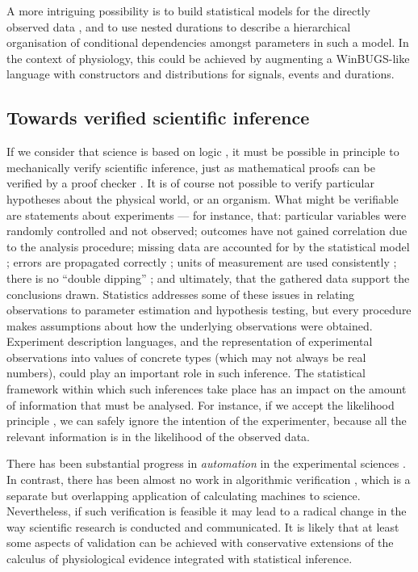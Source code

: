 A more intriguing possibility is to build statistical models for the
directly observed data \citep{Daniell1991}, and to use nested
durations to describe a hierarchical organisation \citep{Rouder2003}
of conditional dependencies amongst parameters in such a model. In the
context of physiology, this could be achieved by augmenting a
WinBUGS-like \citep{Gilks1994} language with constructors and
distributions for signals, events and durations.


\subsection*{Towards verified scientific inference}

If we consider that science is based on logic \citep{Jaynes2003}, it
must be possible in principle to mechanically verify scientific
inference, just as mathematical proofs can be verified by a proof
checker \citep{Harrison2009}. It is of course not possible to verify
particular hypotheses about the physical world, or an organism. What
might be verifiable are statements about experiments --- for instance,
that: particular variables were randomly controlled and not observed;
outcomes have not gained correlation due to the analysis procedure;
missing data are accounted for by the statistical model
\citep{Gelman2003}; errors are propagated correctly
\citep{Taylor1997}; units of measurement are used consistently
\citep{Kennedy1997}; there is no ``double dipping''
\citep{Kriegeskorte2009}; and ultimately, that the gathered data
support the conclusions drawn. Statistics addresses some of these
issues in relating observations to parameter estimation and hypothesis
testing, but every procedure makes assumptions about how the
underlying observations were obtained. Experiment description
languages, and the representation of experimental observations into
values of concrete types (which may not always be real numbers),
could play an important role in such inference. The statistical
framework within which such inferences take place has an impact on the
amount of information that must be analysed. For instance, if we
accept the likelihood principle \citep{Jaynes2003}, we can safely
ignore the intention of the experimenter, because all the relevant
information is in the likelihood of the observed data.

There has been substantial progress in \emph{automation} in the
experimental sciences \citep{King2004}. In contrast, there has been
almost no work in algorithmic verification \citep{Kropf1999,
  Sadot}, which is a separate but overlapping application of
calculating machines to science. Nevertheless, if such verification is
feasible it may lead to a radical change in the way scientific
research is conducted and communicated. It is likely that at least
some aspects of validation can be achieved with conservative
extensions of the calculus of physiological evidence integrated with
statistical inference.


